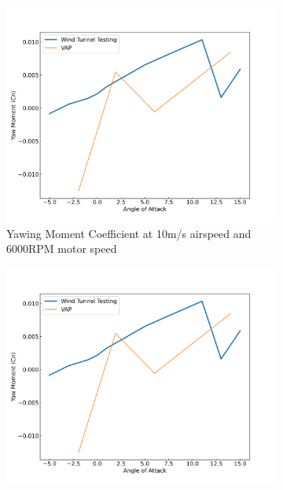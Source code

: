 \begin{figure}[H]
    \centering
    \begin{subfigure}[b]{0.467\textwidth}
        \centering
        \includegraphics[width=\textwidth]{05_Results/VAP/tractor/Cn/10ms_11000RPM_Cn.png}
        \caption{Yawing Moment Coefficient at 10m/s airspeed and 6000RPM motor speed}
        \label{fig:missing}
    \end{subfigure}
    \begin{subfigure}[b]{0.467\textwidth}
        \centering
        \includegraphics[width=\textwidth]{05_Results/VAP/tractor/Cn/10ms_11000RPM_Cn.png}

\end{subfigure}
\end{figure}
